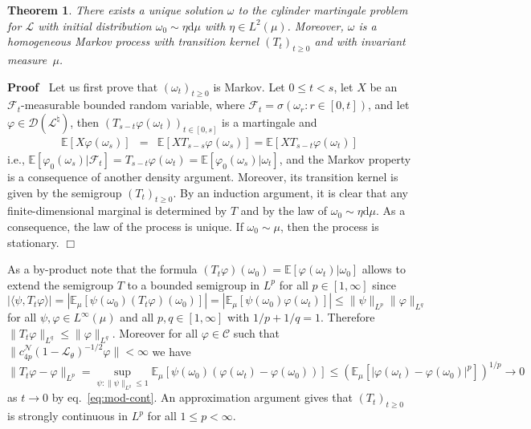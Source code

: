 \documentclass{article}
\newcommand{\mathd}{\mathrm{d}}
\newcommand{\nobracket}{}
\newenvironment{proof}{\noindent\textbf{Proof\ }}{\hspace*{\fill}$\Box$\medskip}
\newtheorem{theorem}{Theorem}
\begin{document}
\begin{theorem}
  \label{thm:unique-mart}There exists a unique solution $\omega$ to the
  cylinder martingale problem for $\mathcal{L}$ with initial distribution
  $\omega_0 \sim \eta \mathd \mu$ with $\eta \in L^2 (\mu)$. Moreover,
  $\omega$ is a homogeneous Markov process with transition kernel $(T_t)_{t
  \geqslant 0}$ and with invariant measure~$\mu$.
\end{theorem}

\begin{proof}
  Let us first prove that $(\omega_t)_{t \geqslant 0}$ is Markov. Let $0
  \leqslant t < s$, let $X$ be an $\mathcal{F}_t$-measurable bounded random
  variable, where $\mathcal{F}_t = \sigma (\omega_r : r \in [0, t])$, and let
  $\varphi \in \mathcal{D} (\mathcal{L}^{\natural})$, then $(T_{s - t} \varphi
  (\omega_t))_{t \in [0, s]}$ is a martingale and
  \[ \begin{array}{lll}
       \mathbb{E} [X \varphi (\omega_s)] & = & \mathbb{E} [X T_{s - s} \varphi
       (\omega_s)] =\mathbb{E} [X T_{s - t} \varphi (\omega_t)]
     \end{array} \]
  i.e., $\mathbb{E} [\varphi_0 (\omega_s) | \mathcal{F}_t \nobracket] = T_{s -
  t} \varphi (\omega_t) =\mathbb{E} [\varphi_0 (\omega_s) | \omega_t
  \nobracket]$, and the Markov property is a consequence of another density
  argument. Moreover, its transition kernel is given by the semigroup
  $(T_t)_{t \geqslant 0}$. By an induction argument, it is clear that any
  finite-dimensional marginal is determined by $T$ and by the law of $\omega_0
  \sim \eta \mathd \mu$. As a consequence, the law of the process is unique.
  If $\omega_0 \sim \mu$, then the process is stationary.
\end{proof}

\begin{remark}
  As a by-product note that the formula $(T_t \varphi) (\omega_0) =\mathbb{E}
  [\varphi (\omega_t) | \omega_0]$ allows to extend the semigroup $T$ to a
  bounded semigroup in $L^p$ for all $p \in [1, \infty]$ since
  \[ | \langle \psi, T_t \varphi \rangle | = | \mathbb{E}_{\mu} [\psi
     (\omega_0) (T_t \varphi) (\omega_0)] | = | \mathbb{E}_{\mu} [\psi
     (\omega_0) \varphi (\omega_t)] | \leqslant \| \psi \|_{L^p} \| \varphi
     \|_{L^q} \]
  for all $\psi, \varphi \in L^{\infty} (\mu)$ and all $p, q \in [1, \infty]$
  with $1 / p + 1 / q = 1$. Therefore $\| T_t \varphi \|_{L^q} \leqslant \|
  \varphi \|_{L^q}$. Moreover for all $\varphi \in \mathcal{C}$ such that $\|
  c_{4 p}^{\mathcal{N}} (1 -\mathcal{L}_{\theta})^{- 1 / 2} \varphi \| <
  \infty$ we have
  \[ \| T_t \varphi - \varphi \|_{L^p} = \sup_{\psi : \| \psi \|_{L^q}
     \leqslant 1} \mathbb{E}_{\mu} [\psi (\omega_0) (\varphi (\omega_t) -
     \varphi (\omega_0))] \leqslant (\mathbb{E}_{\mu} [| \varphi (\omega_t) -
     \varphi (\omega_0) |^p])^{1 / p} \rightarrow 0 \]
  as $t \rightarrow 0$ by eq.~{\eqref{eq:mod-cont}}. An approximation argument
  gives that $(T_t)_{t \geqslant 0}$ is strongly continuous in $L^p$ for all
  $1 \leqslant p < \infty$.
\end{remark}
\end{document}
